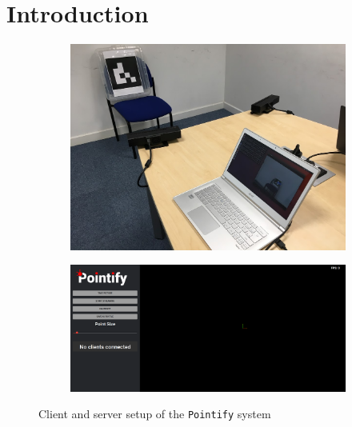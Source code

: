 \documentclass{article}
\begin{document}
\section{Introduction}
\begin{figure}[h]
\centering
\begin{subfigure}[b]{0.49\textwidth}
  \centering
  \includegraphics[scale=0.175]{pointifysetup}
\end{subfigure}
\begin{subfigure}[b]{0.49\textwidth}
  \centering
  \includegraphics[scale=0.15]{pointifyserver}
\end{subfigure}
\caption{Client and server setup of the \texttt{Pointify} system}
\label{fig:pointifydemo}
\end{figure}
\end{document}

